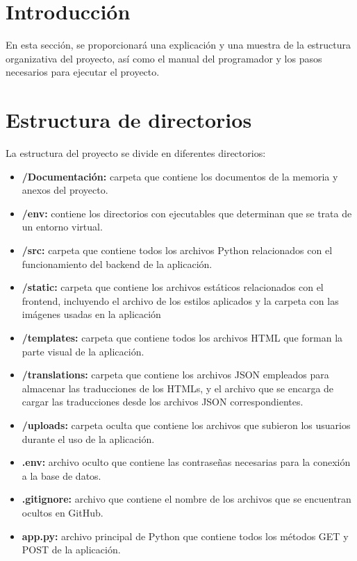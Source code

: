 
\section{Introducción}
En esta sección, se proporcionará una explicación y una muestra de la estructura organizativa del proyecto, así como el manual del programador y los pasos necesarios para ejecutar el proyecto.

\section{Estructura de directorios}
La estructura del proyecto se divide en diferentes directorios:

\begin{itemize}
    \item \textbf{/Documentación:} carpeta que contiene los documentos de la memoria y anexos del proyecto.
    \item \textbf{/env:} contiene los directorios con ejecutables que determinan que se trata de un entorno virtual.
    \item \textbf{/src:} carpeta que contiene todos los archivos Python relacionados con el funcionamiento del backend de la aplicación.
    \item \textbf{/static:} carpeta que contiene los archivos estáticos relacionados con el frontend, incluyendo el archivo de los estilos aplicados y la carpeta con las imágenes usadas en la aplicación
    \item \textbf{/templates:} carpeta que contiene todos los archivos HTML que forman la parte visual de la aplicación.
    \item \textbf{/translations:} carpeta que contiene los archivos JSON empleados para almacenar las traducciones de los HTMLs, y el archivo que se encarga de cargar las traducciones desde los archivos JSON correspondientes.
    \item \textbf{/uploads:} carpeta oculta que contiene los archivos que subieron los usuarios durante el uso de la aplicación.
    \item \textbf{.env:} archivo oculto que contiene las contraseñas necesarias para la conexión a la base de datos.
    \item \textbf{.gitignore:} archivo que contiene el nombre de los archivos que se encuentran ocultos en GitHub.
    \item \textbf{app.py:} archivo principal de Python que contiene todos los métodos GET y POST de la aplicación. 

\end{itemize}
